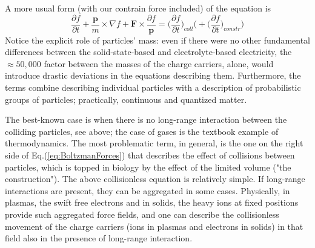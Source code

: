 A more usual form (with our contrain force included) of the equation is
\begin{equation}
	\frac{\partial f}{\partial t} + \frac{\mathbf{p}}{m}\times \nabla f
	+ \mathbf{F} \times \frac{\partial f}{\mathbf{p}}
	=\biggl(\frac{\partial f}{\partial t}\biggr)_{coll}
	\biggl(	+ \biggl( \frac{\partial f}{\partial t}\biggr)_{constr}\biggr)
	\label{eq:BoltzmannMass}
\end{equation}
Notice the explicit role of particles' mass:
even if there were no other fundamental differences between the 
solid-state-based and electrolyte-based electricity, the $\approx 50,000$ factor between the masses of the charge carriers, alone, would introduce drastic deviations
in the equations describing them.
Furthermore, the terms combine describing individual particles with a description of probabilistic groups of particles; practically, continuous and quantized matter.


The best-known case is when there is no long-range interaction
between the colliding particles, see above; the case of gases is the textbook example of thermodynamics.
The most problematic term, in general, is the one on the right side of Eq.(\ref{eq:BoltzmanForces}) that describes 
the effect of collisions between particles, which is topped in biology by the effect of the limited volume ("the construction"). The above collisionless equation is relatively simple. If long-range interactions are present, they can be aggregated in some cases. Physically, in plasmas, the swift free electrons and in solids, the heavy ions at fixed positions provide such aggregated force fields, and one can describe the collisionless movement of the charge carriers (ions in plasmas and electrons in solids) in that field also in the presence of long-range interaction. 

